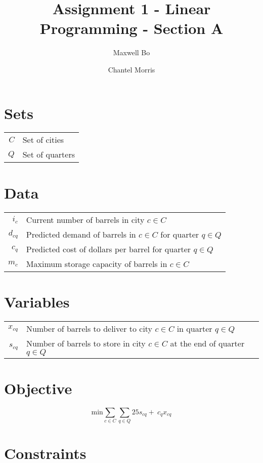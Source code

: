 \documentclass[a4paper]{article}
\title{Assignment 1 - Linear Programming - Section A}
\author{Maxwell Bo  \and Chantel Morris}
\begin{document}
 

\maketitle

\section*{Sets}

\begin{tabular}{rl}
    $C$ & Set of cities\\
    $Q$ & Set of quarters
\end{tabular}

\section*{Data}

\begin{tabular}{rl}
    $i_c$ & Current number of barrels in city $c \in C$\\
    $d_{cq}$ & Predicted demand of barrels in $c \in C$ for quarter $q \in Q$\\
    $c_q$ & Predicted cost of dollars per barrel for quarter $q \in Q$\\
    $m_c$ & Maximum storage capacity of barrels in $c \in C$
\end{tabular}

\section*{Variables}

\begin{tabular}{rl}
    $x_{cq}$ & Number of barrels to deliver to city $c \in C$ in quarter $q \in Q$\\
    $s_{cq}$ & Number of barrels to store in city $c \in C$ at the end of quarter $q \in Q$\\
\end{tabular}

\section*{Objective}

\[
\text{min} \sum_{c \in C}\sum_{q \in Q} 25 s_{cq} +\: c_q x_{cq}
\]

\section*{Constraints}
\end{document}
